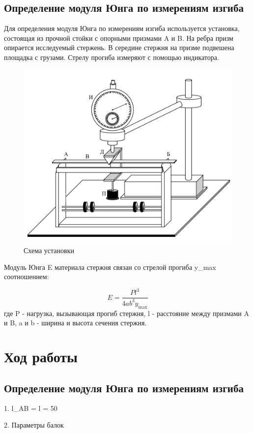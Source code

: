\documentclass[a4paper, 12pt]{article}
\begin{document}
\newpage

\subsection{Определение модуля Юнга по измерениям изгиба}
Для определения модуля Юнга по измерениям изгиба используется установка, состоящая из прочной стойки с опорными призмами A и B. На ребра призм опирается исследуемый стержень. В середине стержня на призме подвешена площадка с грузами. Стрелу прогиба измеряют с помощью индикатора.

\begin{figure}[h]
\centering
\includegraphics[width=0.5\linewidth]{схема установки.png}
\caption{Схема установки}
\label{fig:voltage_current}
\end{figure}

Модуль Юнга E материала стержня связан со стрелой прогиба y_max соотношением:

\[ E = \frac{P l^3}{4ab^3 y_{\max}} \]
где P - нагрузка, вызывающая прогиб стержня, l - расстояние между призмами A и B, a и b - ширина и высота сечения стержня.

\newpage
\section{Ход работы}

\subsection{Определение модуля Юнга по измерениям изгиба}

1. l_{AB} = l = 50\ 

2. Параметры балок
\end{document}
